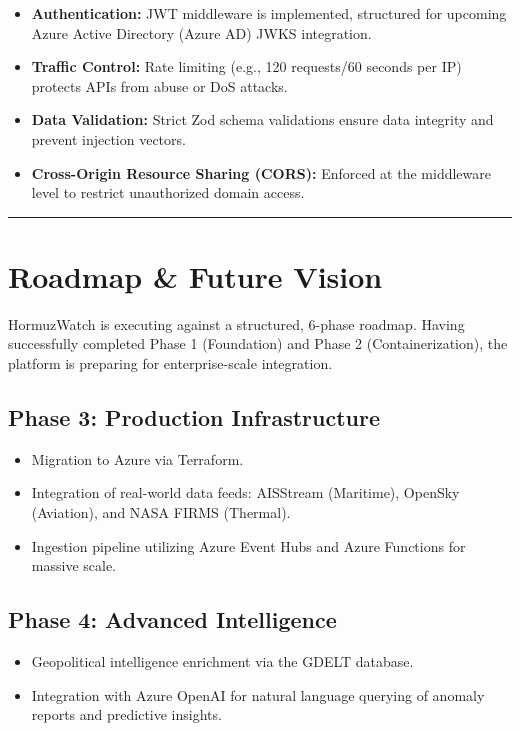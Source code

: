 \documentclass[11pt,a4paper]{article}
\begin{document}
\begin{itemize}
    \item \textbf{Authentication:} JWT middleware is implemented, structured for upcoming Azure Active Directory (Azure AD) JWKS integration.
    \item \textbf{Traffic Control:} Rate limiting (e.g., 120 requests/60 seconds per IP) protects APIs from abuse or DoS attacks.
    \item \textbf{Data Validation:} Strict Zod schema validations ensure data integrity and prevent injection vectors.
    \item \textbf{Cross-Origin Resource Sharing (CORS):} Enforced at the middleware level to restrict unauthorized domain access.
\end{itemize}

\noindent\textcolor{textsecondary}{\rule{\textwidth}{0.5pt}}

\section{Roadmap \& Future Vision}
HormuzWatch is executing against a structured, 6-phase roadmap. Having successfully completed Phase 1 (Foundation) and Phase 2 (Containerization), the platform is preparing for enterprise-scale integration.

\subsection{Phase 3: Production Infrastructure}
\begin{itemize}
    \item Migration to Azure via Terraform.
    \item Integration of real-world data feeds: AISStream (Maritime), OpenSky (Aviation), and NASA FIRMS (Thermal).
    \item Ingestion pipeline utilizing Azure Event Hubs and Azure Functions for massive scale.
\end{itemize}

\subsection{Phase 4: Advanced Intelligence}
\begin{itemize}
    \item Geopolitical intelligence enrichment via the GDELT database.
    \item Integration with Azure OpenAI for natural language querying of anomaly reports and predictive insights.
\end{itemize}
\end{document}
